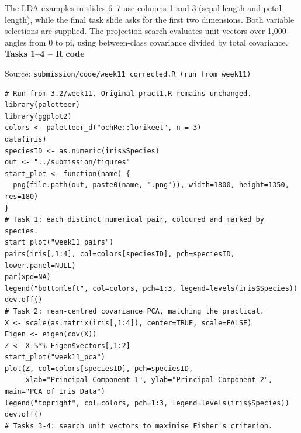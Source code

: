\documentclass{article}
\begin{document}
The LDA examples in slides 6--7 use columns 1 and 3 (sepal length and petal length), while the final task slide asks for the first two dimensions. Both variable selections are supplied. The projection search evaluates unit vectors over 1,000 angles from 0 to pi, using between-class covariance divided by total covariance.
{\large\bfseries\color{blue} Tasks 1--4 -- R code}\par{\small Source: \texttt{submission/code/week11\_corrected.R (run from week11)}}\par
\begin{verbatim}
# Run from 3.2/week11. Original pract1.R remains unchanged.
library(paletteer)
library(ggplot2)
colors <- paletteer_d("ochRe::lorikeet", n = 3)
data(iris)
speciesID <- as.numeric(iris$Species)
out <- "../submission/figures"
start_plot <- function(name) {
  png(file.path(out, paste0(name, ".png")), width=1800, height=1350, res=180)
}
# Task 1: each distinct numerical pair, coloured and marked by species.
start_plot("week11_pairs")
pairs(iris[,1:4], col=colors[speciesID], pch=speciesID, lower.panel=NULL)
par(xpd=NA)
legend("bottomleft", col=colors, pch=1:3, legend=levels(iris$Species))
dev.off()
# Task 2: mean-centred covariance PCA, matching the practical.
X <- scale(as.matrix(iris[,1:4]), center=TRUE, scale=FALSE)
Eigen <- eigen(cov(X))
Z <- X %*% Eigen$vectors[,1:2]
start_plot("week11_pca")
plot(Z, col=colors[speciesID], pch=speciesID,
     xlab="Principal Component 1", ylab="Principal Component 2", main="PCA of Iris Data")
legend("topright", col=colors, pch=1:3, legend=levels(iris$Species))
dev.off()
# Tasks 3-4: search unit vectors to maximise Fisher's criterion.
\end{verbatim}
\end{document}
